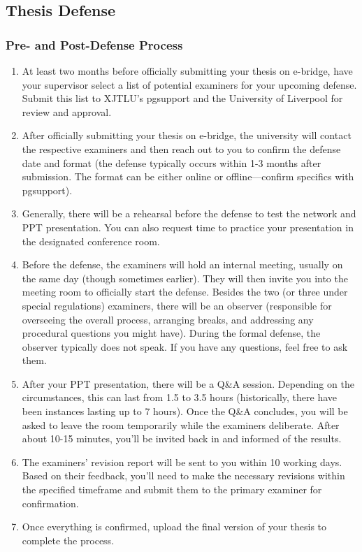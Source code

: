 \subsection{Thesis Defense}

\subsubsection{Pre- and Post-Defense Process}

\begin{enumerate}
    \item At least two months before officially submitting your thesis on e-bridge, have your supervisor select a list of potential examiners for your upcoming defense. Submit this list to XJTLU's pgsupport and the University of Liverpool for review and approval.
    \item After officially submitting your thesis on e-bridge, the university will contact the respective examiners and then reach out to you to confirm the defense date and format (the defense typically occurs within 1-3 months after submission. The format can be either online or offline—confirm specifics with pgsupport).
    \item Generally, there will be a rehearsal before the defense to test the network and PPT presentation. You can also request time to practice your presentation in the designated conference room.
    \item Before the defense, the examiners will hold an internal meeting, usually on the same day (though sometimes earlier). They will then invite you into the meeting room to officially start the defense. Besides the two (or three under special regulations) examiners, there will be an observer (responsible for overseeing the overall process, arranging breaks, and addressing any procedural questions you might have). During the formal defense, the observer typically does not speak. If you have any questions, feel free to ask them.
    \item After your PPT presentation, there will be a Q\&A session. Depending on the circumstances, this can last from 1.5 to 3.5 hours (historically, there have been instances lasting up to 7 hours). Once the Q\&A concludes, you will be asked to leave the room temporarily while the examiners deliberate. After about 10-15 minutes, you'll be invited back in and informed of the results.
    \item The examiners' revision report will be sent to you within 10 working days. Based on their feedback, you'll need to make the necessary revisions within the specified timeframe and submit them to the primary examiner for confirmation.
    \item Once everything is confirmed, upload the final version of your thesis to complete the process.
\end{enumerate}

